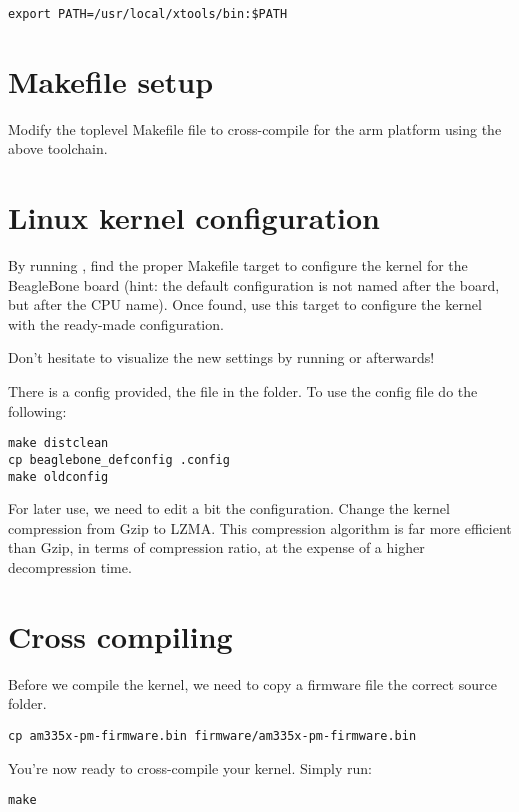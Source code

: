 \begin{verbatim}
export PATH=/usr/local/xtools/bin:$PATH
\end{verbatim}

\section{Makefile setup}

Modify the toplevel Makefile file to cross-compile for the arm
platform using the above toolchain.

\section{Linux kernel configuration}

By running , find the proper Makefile target to
configure the kernel for the BeagleBone board (hint: the default
configuration is not named after the board, but after the CPU
name). Once found, use this target to configure the kernel with the
ready-made configuration.

Don't hesitate to visualize the new settings by running
 or  afterwards!

There is a config provided, the  file in the  folder.
To use the config file do the following:

\begin{verbatim}
make distclean
cp beaglebone_defconfig .config
make oldconfig
\end{verbatim}

For later use, we need to edit a bit the configuration. Change the
kernel compression from Gzip to LZMA. This compression algorithm is
far more efficient than Gzip, in terms of compression ratio, at the
expense of a higher decompression time.

\section{Cross compiling}

Before we compile the kernel, we need to copy a firmware file the correct source folder.
\begin{verbatim}
cp am335x-pm-firmware.bin firmware/am335x-pm-firmware.bin
\end{verbatim}

You're now ready to cross-compile your kernel. Simply run:

\begin{verbatim}
make
\end{verbatim}

